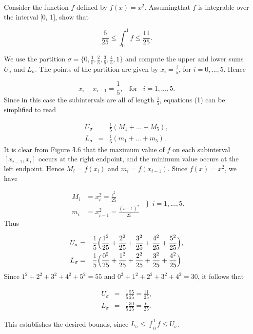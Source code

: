 \begin{example}
Consider the function $f$ defined by $f(x)= x^2 $. Assumingthat $f$ is integrable over the interval [0, 1], show that

$$
\frac{6}{25} \leq \int_{0}^{1} f \leq \frac{11}{25}.
$$

\noindent We use the partition $\sigma = \{ 0, \frac{1}{5},\frac{2}{5}, \frac{3}{5}, \frac{4}{5}, 1 \}$ and compute the upper and lower sums $U_{\sigma}$ and $L_{\sigma}$. The points of the partition are given by $x_i = \frac{i}{5}$, for $i= 0, ..., 5$. Hence 

$$
x_i - x_{i-1} = \frac{1}{5},   \;\;\;\mbox{for}\;\;\;    i = 1, . . ., 5.
$$
\noindent Since in this case the subintervals are all of length $\frac{1}{5}$, equations (1) can be simplified to read

\begin{eqnarray*}
U_{\sigma} &=& \frac{1}{5}(M_1 + ... + M_5),\\
L_{\sigma} &=& \frac{1}{5}(m_1 + ... + m_5).  
\end{eqnarray*}
\noindent It is clear from Figure \f{4.6} that the maximum value of $f$ on each subinterval $[x_{i - 1}, x_i]$ occurs at the right endpoint, and the minimum value occurs at the left endpoint.  Hence $M_i = f(x_i)$ and $m_i = f(x_{i -1})$. Since $f(x) = x^2$, we have


$$
\begin{array}{ll}
M_{i} &= x_{i}^2 = \frac{i^2}{25} \\
m_{i} &= x_{i-1}^2 = \frac{(i - 1)^2}{25}  
\end{array}
\left\}  i = 1,..., 5.
\right .
$$
\noindent Thus 

\begin{eqnarray*}
U_{\sigma} &=& \frac{1}{5} \Bigl( \frac{1^2}{25} + \frac{2^2}{25} + \frac{3^2}{25} + \frac{4^2}{25} + \frac{5^2}{25} \Bigr),
\\ L_{\sigma} &=& \frac{1}{5} \Bigl( \frac{0^2}{25} + \frac{1^2}{25} + \frac{2^2}{25} + \frac{3^2}{25} + \frac{4^2}{25} \Bigr) .
\end{eqnarray*}
\noindent Since $1^2+2^2+3^2+4^2+5^2= 55$ and $0^2+ 1^2+2^2+3^2+4^2= 30$, it follows that 

\begin{eqnarray*}
U_{\sigma} &=& \frac{1}{5}\frac{55}{25} = \frac{11}{25},\\
L_{\sigma} &=& \frac{1}{5}\frac{30}{25} = \frac{6}{25}.
\end{eqnarray*}

This establishes the desired bounds, since $L_{\sigma} \leq \int_{0}^{1} f \leq U_{\sigma}$.
\end{example}
\medskip

